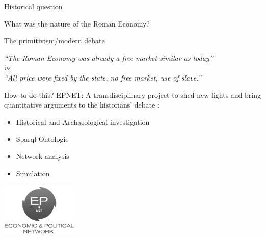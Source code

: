 \documentclass[8pt, handout=show,notes=show]{beamer}
\begin{document}
\begin{frame}{Historical question}
	\begin{center}
		\Huge
		What was the nature of the Roman Economy?\\
	\end{center}
	\vfill
	\begin{block}
		{The primitivism/modern debate}
		\begin{center}
		    \em
		    ``The Roman Economy was already a free-market similar as today'' \\
		    \emph{vs}\\
		    ``All price were fixed by the state, no free market, use of slave.''
		\end{center}
	\end{block}
\end{frame}
\begin{frame}{How to do this?}
	EPNET:	A transdisciplinary project to shed new lights and bring quantitative arguments to the historians' debate :
	\begin{itemize}
		\item Historical and Archaeological investigation
		\item Sparql Ontologie
		\item Network analysis
		\item Simulation
	\end{itemize}
	\begin{center}
		\includegraphics[height=2.5cm]{images/epnetLogo.png}
	\end{center}
	
\end{frame}
\end{document}
